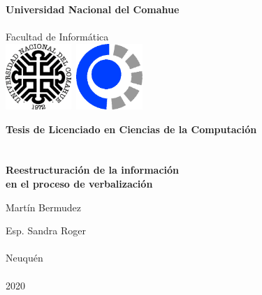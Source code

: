 
\titlepage

\begin{center}
\ \\
\ \\
\vspace{-1cm}
 

\ \\

\vspace{0.5cm}
{\Large{\bf \sc Universidad Nacional del Comahue}}\\

\ \\
{\Large { \sc Facultad de Informática}}\\

\vspace{-2.5cm}
\mbox{\hspace{-1cm}\includegraphics[width=2.5cm,height=2.5cm]{img/unc.png}\hspace{13cm} \includegraphics[width=2.5cm,height=2.5cm]{img/fai.png}}


\vspace{6cm}

{\Large {\bf\sc Tesis de Licenciado en Ciencias de la Computación}}\\
\ \\
\ \\
{\LARGE {\bf Reestructuración de la información \\en el proceso de verbalización}}\\
\vspace{3cm}


{\Large Martín Bermudez}\\
\vspace{2cm}

{\Large Esp. Sandra Roger}\\
\ \\

\vfill
{\Large {\sc Neuquén}\hspace{6cm}{\sc Argentina}}\\
\ \\

{\Large 2020}\\

\end{center}

\pagebreak

